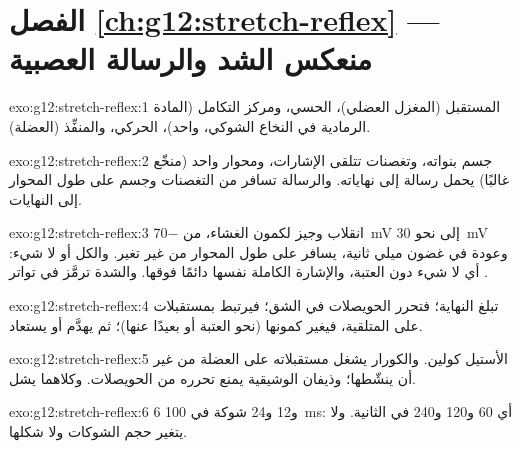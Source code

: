 \section*{الفصل \ref{ch:g12:stretch-reflex} --- منعكس الشد والرسالة العصبية}

\begin{solution}{exo:g12:stretch-reflex:1}
المستقبل (المغزل العضلي)،  الحسي، ومركز التكامل (المادة
الرمادية في النخاع الشوكي،  واحد)،  الحركي، والمنفِّذ
(العضلة).
\end{solution}

\begin{solution}{exo:g12:stretch-reflex:2}
جسم  بنواته، وتغصنات تتلقى الإشارات، ومحوار واحد (منخّع غالبًا)
يحمل رسالة  إلى نهاياته. والرسالة تسافر من التغصنات وجسم 
على طول المحوار إلى النهايات.
\end{solution}

\begin{solution}{exo:g12:stretch-reflex:3}
انقلاب وجيز لكمون الغشاء، من \qty{-70}{mV} إلى نحو \qty{+30}{mV} وعودة
في غضون ميلي ثانية، يسافر على طول المحوار من غير تغير. والكل أو لا
شيء: أي لا شيء دون العتبة، والإشارة الكاملة نفسها دائمًا فوقها. والشدة
ترمَّز في تواتر .
\end{solution}

\begin{solution}{exo:g12:stretch-reflex:4}
 تبلغ النهاية؛ فتحرر الحويصلات  في الشق؛
فيرتبط بمستقبلات على  المتلقية، فيغير كمونها (نحو العتبة أو
بعيدًا عنها)؛ ثم يهدَّم أو يستعاد.
\end{solution}

\begin{solution}{exo:g12:stretch-reflex:5}
الأستيل كولين. والكورار يشغل مستقبلاته على العضلة من غير أن ينشّطها؛
وذيفان الوشيقية يمنع تحرره من الحويصلات. وكلاهما يشل.
\end{solution}

\begin{solution}{exo:g12:stretch-reflex:6}
6 و12 و24 شوكة في \qty{100}{ms}: أي 60 و120 و240 في الثانية. ولا يتغير
حجم الشوكات ولا شكلها.
\end{solution}

